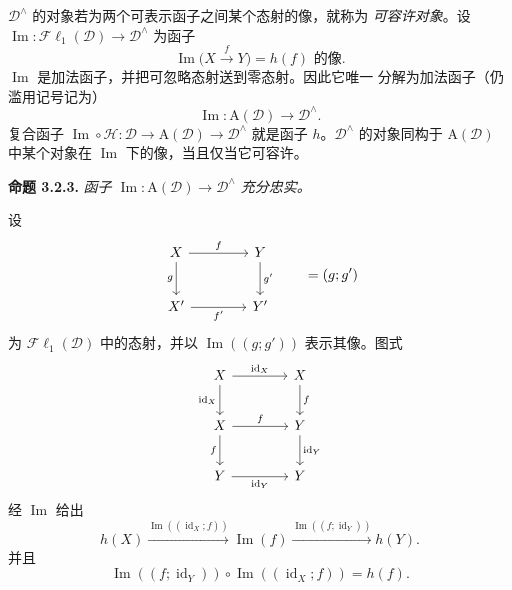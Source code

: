 \clearpage
{}%
\begingroup\small
\setlength{\parskip}{0pt}\setlength{\emergencystretch}{1.5em}

$\mathcal D^\wedge$ 的对象若为两个可表示函子之间某个态射的像，就称为
\emph{可容许对象}。设
$\operatorname{Im}\colon\mathcal{F}\ell_1(\mathcal D)\to\mathcal D^\wedge$
为函子
\[
\operatorname{Im}\bigl(X\xrightarrow fY\bigr)=h(f)\text{ 的像}.
\tag{3.2.2.1}
\]
$\operatorname{Im}$ 是加法函子，并把可忽略态射送到零态射。因此它唯一
分解为加法函子（仍滥用记号记为）
\[
\operatorname{Im}\colon\mathrm A(\mathcal D)\longrightarrow\mathcal D^\wedge.
\tag{3.2.2.2}
\]
复合函子
$\operatorname{Im}\circ\mathcal H\colon
\mathcal D\longrightarrow\mathrm A(\mathcal D)
\longrightarrow\mathcal D^\wedge$
就是函子 $h$。$\mathcal D^\wedge$ 的对象同构于
$\mathrm A(\mathcal D)$ 中某个对象在 $\operatorname{Im}$ 下的像，当且仅当它可容许。

\medskip\noindent\textbf{命题 3.2.3.}\quad
\textit{函子 $\operatorname{Im}\colon\mathrm A(\mathcal D)\to
\mathcal D^\wedge$ 充分忠实。}

设
\[
\begin{tikzcd}[column sep=4em,row sep=2.4em]
X\arrow[r,"f"]\arrow[d,"g"']&Y\arrow[d,"g'"]\\
X'\arrow[r,"f'"']&Y'
\end{tikzcd}
\qquad=(g;g')
\]
为 $\mathcal{F}\ell_1(\mathcal D)$ 中的态射，并以
$\operatorname{Im}((g;g'))$ 表示其像。图式
\[
\begin{tikzcd}[column sep=4em,row sep=2.2em]
X\arrow[r,"\operatorname{id}_X"]\arrow[d,"\operatorname{id}_X"']&X\arrow[d,"f"]\\
X\arrow[r,"f"]\arrow[d,"f"']&Y\arrow[d,"\operatorname{id}_Y"]\\
Y\arrow[r,"\operatorname{id}_Y"']&Y
\end{tikzcd}
\]
经 $\operatorname{Im}$ 给出
\[
h(X)\xrightarrow{\operatorname{Im}((\operatorname{id}_X;f))}
\operatorname{Im}(f)\xrightarrow{\operatorname{Im}((f;\operatorname{id}_Y))}h(Y).
\]
并且
\[
\operatorname{Im}((f;\operatorname{id}_Y))\circ
\operatorname{Im}((\operatorname{id}_X;f))=h(f).
\tag{3.2.3.1}
\]
\endgroup
